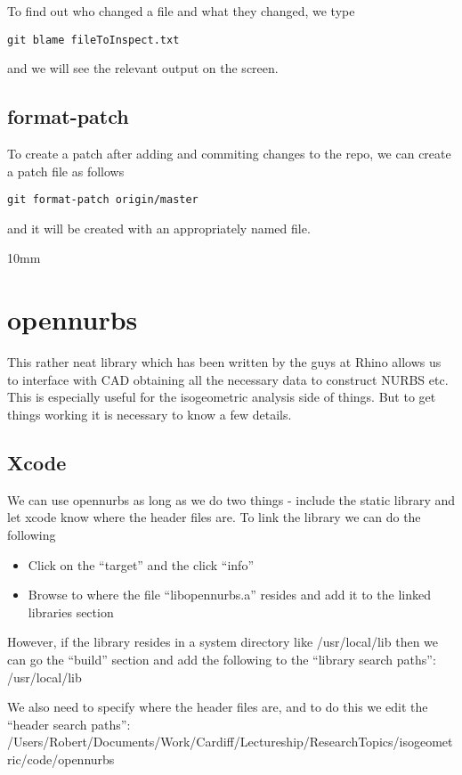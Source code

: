 \documentclass[a4paper, 10pt]{article}
\begin{document}
To find out who changed a file and what they changed, we type
\begin{verbatim}
git blame fileToInspect.txt
\end{verbatim}
and we will see the relevant output on the screen.

\subsection*{format-patch}
\label{sec:format-patch}

To create a patch after adding and commiting changes to the repo, we
can create a patch file as follows
\begin{verbatim}
git format-patch origin/master
\end{verbatim}
and it will be created with an appropriately named file.

{10mm}
\section*{opennurbs}

This rather neat library which has been written by the guys at Rhino allows us to interface with CAD obtaining all the necessary data to construct NURBS etc. This is especially useful for the isogeometric analysis side of things. But to get things working it is necessary to know a few details.

\subsection*{Xcode}
We can use opennurbs as long as we do two things - include the static library and let xcode know where the header files are. To link the library we can do the following
\begin{itemize}
\item Click on the ``target'' and the click ``info''
\item Browse to where the file ``libopennurbs.a'' resides and add it to the linked libraries section
\end{itemize}

However, if the library resides in a system directory like /usr/local/lib then we can go the ``build'' section and add the following to the ``library search paths'': /usr/local/lib

We also need to specify where the header files are, and to do this we edit the ``header search paths'': /Users/Robert/Documents/Work/Cardiff/Lectureship/ResearchTopics/isogeometric/code/opennurbs
\end{document}
